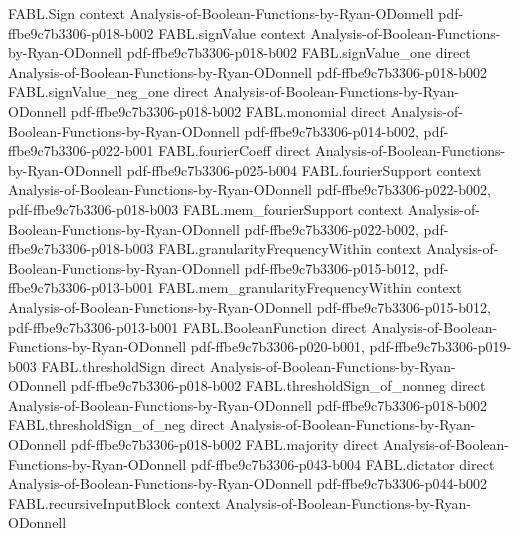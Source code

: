 \begin{theorem}
\label{FABL.dictator_unanimous}
\leanok
{}
\proofstep
  {FABL.Sign}
  {context}
  {Analysis-of-Boolean-Functions-by-Ryan-ODonnell}
  {pdf-ffbe9c7b3306-p018-b002}
\proofstep
  {FABL.signValue}
  {context}
  {Analysis-of-Boolean-Functions-by-Ryan-ODonnell}
  {pdf-ffbe9c7b3306-p018-b002}
\proofstep
  {FABL.signValue_one}
  {direct}
  {Analysis-of-Boolean-Functions-by-Ryan-ODonnell}
  {pdf-ffbe9c7b3306-p018-b002}
\proofstep
  {FABL.signValue_neg_one}
  {direct}
  {Analysis-of-Boolean-Functions-by-Ryan-ODonnell}
  {pdf-ffbe9c7b3306-p018-b002}
\proofstep
  {FABL.monomial}
  {direct}
  {Analysis-of-Boolean-Functions-by-Ryan-ODonnell}
  {pdf-ffbe9c7b3306-p014-b002,
    pdf-ffbe9c7b3306-p022-b001}
\proofstep
  {FABL.fourierCoeff}
  {direct}
  {Analysis-of-Boolean-Functions-by-Ryan-ODonnell}
  {pdf-ffbe9c7b3306-p025-b004}
\proofstep
  {FABL.fourierSupport}
  {context}
  {Analysis-of-Boolean-Functions-by-Ryan-ODonnell}
  {pdf-ffbe9c7b3306-p022-b002,
    pdf-ffbe9c7b3306-p018-b003}
\proofstep
  {FABL.mem_fourierSupport}
  {context}
  {Analysis-of-Boolean-Functions-by-Ryan-ODonnell}
  {pdf-ffbe9c7b3306-p022-b002,
    pdf-ffbe9c7b3306-p018-b003}
\proofstep
  {FABL.granularityFrequencyWithin}
  {context}
  {Analysis-of-Boolean-Functions-by-Ryan-ODonnell}
  {pdf-ffbe9c7b3306-p015-b012,
    pdf-ffbe9c7b3306-p013-b001}
\proofstep
  {FABL.mem_granularityFrequencyWithin}
  {context}
  {Analysis-of-Boolean-Functions-by-Ryan-ODonnell}
  {pdf-ffbe9c7b3306-p015-b012,
    pdf-ffbe9c7b3306-p013-b001}
\proofstep
  {FABL.BooleanFunction}
  {direct}
  {Analysis-of-Boolean-Functions-by-Ryan-ODonnell}
  {pdf-ffbe9c7b3306-p020-b001,
    pdf-ffbe9c7b3306-p019-b003}
\proofstep
  {FABL.thresholdSign}
  {direct}
  {Analysis-of-Boolean-Functions-by-Ryan-ODonnell}
  {pdf-ffbe9c7b3306-p018-b002}
\proofstep
  {FABL.thresholdSign_of_nonneg}
  {direct}
  {Analysis-of-Boolean-Functions-by-Ryan-ODonnell}
  {pdf-ffbe9c7b3306-p018-b002}
\proofstep
  {FABL.thresholdSign_of_neg}
  {direct}
  {Analysis-of-Boolean-Functions-by-Ryan-ODonnell}
  {pdf-ffbe9c7b3306-p018-b002}
\proofstep
  {FABL.majority}
  {direct}
  {Analysis-of-Boolean-Functions-by-Ryan-ODonnell}
  {pdf-ffbe9c7b3306-p043-b004}
\proofstep
  {FABL.dictator}
  {direct}
  {Analysis-of-Boolean-Functions-by-Ryan-ODonnell}
  {pdf-ffbe9c7b3306-p044-b002}
\proofstep
  {FABL.recursiveInputBlock}
  {context}
  {Analysis-of-Boolean-Functions-by-Ryan-ODonnell}

\end{theorem}
